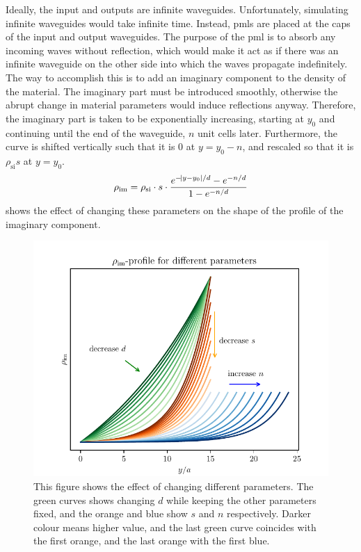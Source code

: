 Ideally, the input and outputs are infinite waveguides.
Unfortunately, simulating infinite waveguides would take infinite time.
Instead, \glspl{pml} are placed at the caps of the input and output waveguides.
The purpose of the \gls{pml} is to absorb any incoming waves without reflection,
which would make it act as if there was an infinite waveguide on the other side
into which the waves propagate indefinitely.
The way to accomplish this is to add an imaginary component to the density of
the material.
The imaginary part must be introduced smoothly,
otherwise the abrupt change in material
parameters would induce reflections anyway.
Therefore, the imaginary part is taken to be exponentially increasing,
starting at $y_0$ and continuing until the end of the waveguide, $n$ unit cells
later.
Furthermore, the curve is shifted vertically such that it is 0 at $y = y_0-n$,
and rescaled so that it is $\rho_\text{si} s$ at $y=y_0$.
\begin{equation}
	\rho_\text{im} = \rho_\text{si} \cdot s \cdot
	\frac{e^{-\abs{y-y_0} / d} - e^{-n/d}}{1 - e^{-n/d}}
\end{equation}
 shows the effect of changing these parameters on the
shape of the profile of the imaginary component.

\begin{figure}[htpb]
	\centering
	\includegraphics{chapters/methods/pml_profile.pdf}
	\caption{%
		This figure shows the effect of changing different parameters.
		The green curves shows changing $d$ while keeping the other parameters
		fixed, and the orange and blue show $s$ and $n$ respectively.
		Darker colour means higher value, and the last green curve coincides
		with the first orange, and the last orange with the first blue.
	}%
	\label{fig:pml_profile}
\end{figure}

